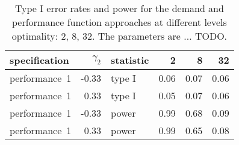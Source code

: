 \begin{table}[ht]
\centering
\begingroup\footnotesize
\begin{tabular}{lrlrrr}
  \hline
specification & $\gamma_2$ & statistic & 2 & 8 & 32 \\ 
  \hline
performance~1 & -0.33 & type I & 0.06 & 0.07 & 0.06 \\ 
  performance~1 & 0.33 & type I & 0.05 & 0.07 & 0.06 \\ 
  performance~1 & -0.33 & power & 0.99 & 0.68 & 0.09 \\ 
  performance~1 & 0.33 & power & 0.99 & 0.65 & 0.08 \\ 
   \hline
\end{tabular}
\endgroup
\caption{Type I error rates and power for the demand and
             performance function approaches at different levels optimality:
             2, 8, 32. The parameters are ... TODO.} 
\label{main-table}
\end{table}
